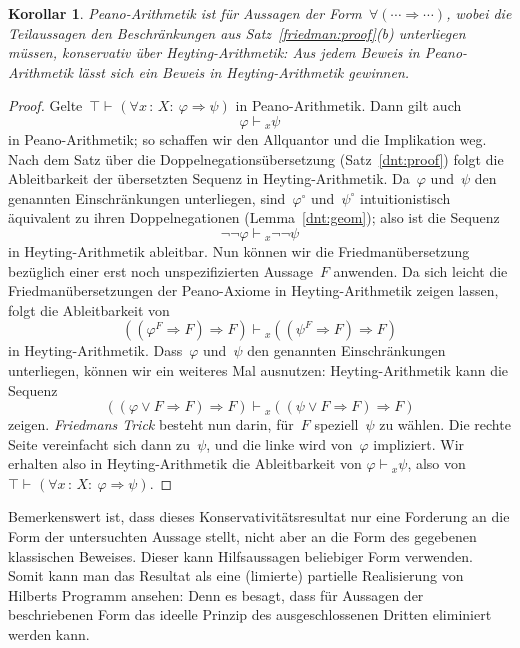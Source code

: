 \documentclass[a4paper,ngerman,12pt]{scrartcl}
\theoremstyle{definition}
\theoremstyle{plain}
\newtheorem{kor}[defn]{Korollar}
\theoremstyle{remark}
\newcommand{\seq}[1]{\mathrel{\vdash\!\!\!_{#1}}}
\renewcommand{\_}{\mathpunct{.}\,}
\newcommand{\?}{\,{:}\,}
\begin{document}
\begin{kor}\label{peanokons}Peano-Arithmetik ist für Aussagen der Form~$\forall (\cdots
\Rightarrow \cdots)$, wobei die Teilaussagen den Beschränkungen
aus Satz~\ref{friedman:proof}(b) unterliegen müssen, \emph{konservativ} über
Heyting-Arithmetik: Aus jedem Beweis in Peano-Arithmetik lässt sich ein Beweis
in Heyting-Arithmetik gewinnen.\end{kor}
\begin{proof}Gelte~$\top \seq{} (\forall x\?X{:}\ \varphi \Rightarrow \psi)$ in
Peano-Arithmetik. Dann gilt auch
\[ \varphi \seq{x} \psi \]
in Peano-Arithmetik; so schaffen wir den Allquantor und die Implikation weg.
Nach dem Satz über die Doppelnegationsübersetzung (Satz~\ref{dnt:proof}) folgt
die Ableitbarkeit der übersetzten Sequenz in Heyting-Arithmetik. Da~$\varphi$
und~$\psi$ den genannten Einschränkungen unterliegen, sind~$\varphi^\circ$
und~$\psi^\circ$ intuitionistisch äquivalent zu ihren Doppelnegationen
(Lemma~\ref{dnt:geom}); also ist die Sequenz
\[ \neg\neg\varphi \seq{x} \neg\neg\psi \]
in Heyting-Arithmetik ableitbar. Nun können wir die Friedmanübersetzung
bezüglich einer erst noch unspezifizierten Aussage~$F$ anwenden. Da sich leicht die
Friedmanübersetzungen der Peano-Axiome in Heyting-Arithmetik zeigen lassen,
folgt die Ableitbarkeit von
\[ ((\varphi^F \Rightarrow F) \Rightarrow F) \seq{x}
  ((\psi^F \Rightarrow F) \Rightarrow F) \]
in Heyting-Arithmetik. Dass~$\varphi$ und~$\psi$ den genannten Einschränkungen
unterliegen, können wir ein weiteres Mal ausnutzen: Heyting-Arithmetik kann die
Sequenz
\[ ((\varphi \vee F \Rightarrow F) \Rightarrow F) \seq{x}
  ((\psi \vee F \Rightarrow F) \Rightarrow F) \]
zeigen. \emph{Friedmans Trick} besteht nun darin, für~$F$ speziell~$\psi$ zu
wählen. Die rechte Seite vereinfacht sich dann zu~$\psi$, und die linke wird
von~$\varphi$ impliziert.
Wir erhalten also in Heyting-Arithmetik die Ableitbarkeit
von $\varphi \seq{x} \psi$, also von
$\top \seq{} (\forall x\?X{:}\ \varphi \Rightarrow \psi)$.
\end{proof}

Bemerkenswert ist, dass dieses Konservativitätsresultat nur eine Forderung
an die Form der untersuchten Aussage stellt, nicht aber an die Form des gegebenen
klassischen Beweises. Dieser kann Hilfsaussagen beliebiger Form verwenden.
Somit kann man das Resultat als eine (limierte) partielle Realisierung
von Hilberts Programm ansehen: Denn es besagt, dass für Aussagen der
beschriebenen Form das ideelle Prinzip des ausgeschlossenen Dritten eliminiert
werden kann.
\end{document}
